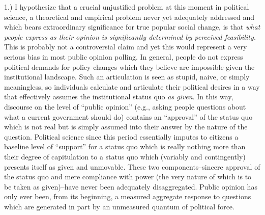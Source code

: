 \documentclass[12pt,book]{article}
\begin{document}
1.) I hypothesize that a crucial unjustified problem at this moment in
political science, a theoretical and empirical problem never yet
adequately addressed and which bears extraordinary significance for true
popular social change, is that \emph{what people express as their
opinion is significantly determined by perceived feasibility.} This is
probably not a controversial claim and yet this would represent a very
serious bias in most public opinion polling. In general, people do not
express political demands for policy changes which they believe are
impossible given the institutional landscape. Such an articulation is
seen as stupid, naive, or simply meaningless, so individuals calculate
and articulate their political desires in a way that effectively assumes
the institutional status quo \emph{as given}. In this way, discourse on
the level of ``public opinion'' (e.g., asking people questions about
what a current government should do) contains an ``approval'' of the
status quo which is not real but is simply assumed into their answer by
the nature of the question. Political science since this period
essentially imputes to citizens a baseline level of ``support'' for a
status quo which is really nothing more than their degree of
capitulation to a status quo which (variably and contingently) presents
itself as given and unmovable. These two components--sincere approval of
the status quo and mere compliance with power (the very nature of which
is to be taken as given)--have never been adequately disaggregated.
Public opinion has only ever been, from its beginning, a measured
aggregate response to questions which are generated in part by an
unmeasured quantum of political force.
\end{document}
